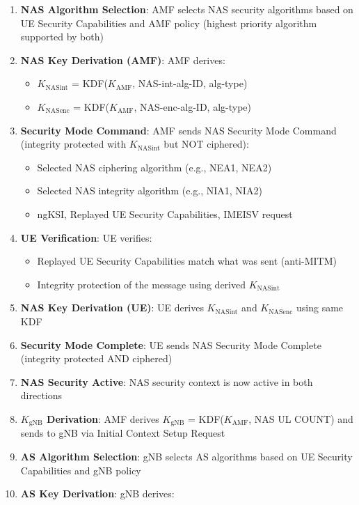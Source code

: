 \begin{enumerate}
\def\labelenumi{\arabic{enumi}.}
\tightlist
\item
  \textbf{NAS Algorithm Selection}: AMF selects NAS security algorithms based on UE Security Capabilities and AMF policy (highest priority algorithm supported by both)
\item
  \textbf{NAS Key Derivation (AMF)}: AMF derives:

  \begin{itemize}
  \tightlist
  \item
    \ensuremath{K_{\mathrm{NASint}}} = KDF(\ensuremath{K_{\mathrm{AMF}}}, NAS-int-alg-ID, alg-type)
  \item
    \ensuremath{K_{\mathrm{NASenc}}} = KDF(\ensuremath{K_{\mathrm{AMF}}}, NAS-enc-alg-ID, alg-type)
  \end{itemize}
\item
  \textbf{Security Mode Command}: AMF sends NAS Security Mode Command (integrity protected with \ensuremath{K_{\mathrm{NASint}}} but NOT ciphered):

  \begin{itemize}
  \tightlist
  \item
    Selected NAS ciphering algorithm (e.g., NEA1, NEA2)
  \item
    Selected NAS integrity algorithm (e.g., NIA1, NIA2)
  \item
    ngKSI, Replayed UE Security Capabilities, IMEISV request
  \end{itemize}
\item
  \textbf{UE Verification}: UE verifies:

  \begin{itemize}
  \tightlist
  \item
    Replayed UE Security Capabilities match what was sent (anti-MITM)
  \item
    Integrity protection of the message using derived \ensuremath{K_{\mathrm{NASint}}}
  \end{itemize}
\item
  \textbf{NAS Key Derivation (UE)}: UE derives \ensuremath{K_{\mathrm{NASint}}} and \ensuremath{K_{\mathrm{NASenc}}} using same KDF
\item
  \textbf{Security Mode Complete}: UE sends NAS Security Mode Complete (integrity protected AND ciphered)
\item
  \textbf{NAS Security Active}: NAS security context is now active in both directions
\item
  \textbf{\ensuremath{K_{\mathrm{gNB}}} Derivation}: AMF derives \ensuremath{K_{\mathrm{gNB}}} = KDF(\ensuremath{K_{\mathrm{AMF}}}, NAS UL COUNT) and sends to gNB via Initial Context Setup Request
\item
  \textbf{AS Algorithm Selection}: gNB selects AS algorithms based on UE Security Capabilities and gNB policy
\item
  \textbf{AS Key Derivation}: gNB derives:


\end{enumerate}
